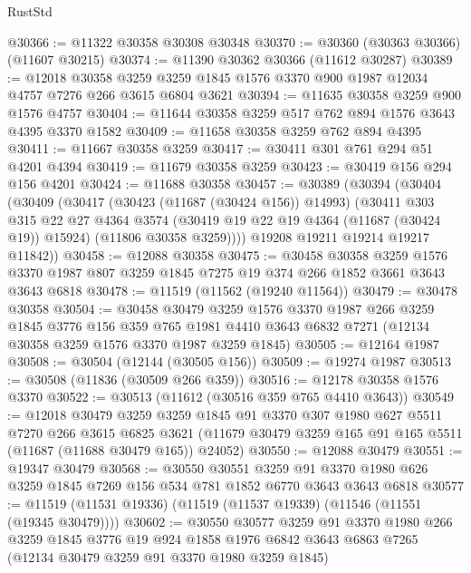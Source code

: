 \begin{lexlean}{RustStd}
\begin{coremodule}
@30366 := @11322 @30358 @30308 @30348
@30370 := @30360 (@30363 @30366) (@11607 @30215)
@30374 := @11390 @30362 @30366 (@11612 @30287)
@30389 := @12018
    @30358
    @3259
    @3259
    @1845
    @1576
    @3370
    @900
    @1987
    @12034
    @4757
    @7276
    @266
    @3615
    @6804
    @3621
@30394 := @11635 @30358 @3259 @900 @1576 @4757
@30404 := @11644 @30358 @3259 @517 @762 @894 @1576 @3643 @4395 @3370 @1582
@30409 := @11658 @30358 @3259 @762 @894 @4395
@30411 := @11667 @30358 @3259
@30417 := @30411 @301 @761 @294 @51 @4201 @4394
@30419 := @11679 @30358 @3259
@30423 := @30419 @156 @294 @156 @4201
@30424 := @11688 @30358
@30457 := @30389
    (@30394
      (@30404
        (@30409
          (@30417
            (@30423 (@11687 (@30424 @156)) @14993)
            (@30411
              @303
              @315
              @22
              @27
              @4364
              @3574
              (@30419 @19 @22 @19 @4364 (@11687 (@30424 @19)) @15924)
              (@11806 @30358 @3259))))
        @19208
        @19211
        @19214
        @19217
        @11842))
@30458 := @12088 @30358
@30475 := @30458
    @30358
    @3259
    @1576
    @3370
    @1987
    @807
    @3259
    @1845
    @7275
    @19
    @374
    @266
    @1852
    @3661
    @3643
    @3643
    @6818
@30478 := @11519 (@11562 (@19240 @11564))
@30479 := @30478 @30358
@30504 := @30458
    @30479
    @3259
    @1576
    @3370
    @1987
    @266
    @3259
    @1845
    @3776
    @156
    @359
    @765
    @1981
    @4410
    @3643
    @6832
    @7271
    (@12134 @30358 @3259 @1576 @3370 @1987 @3259 @1845)
@30505 := @12164 @1987
@30508 := @30504 (@12144 (@30505 @156))
@30509 := @19274 @1987
@30513 := @30508 (@11836 (@30509 @266 @359))
@30516 := @12178 @30358 @1576 @3370
@30522 := @30513 (@11612 (@30516 @359 @765 @4410 @3643))
@30549 := @12018
    @30479
    @3259
    @3259
    @1845
    @91
    @3370
    @307
    @1980
    @627
    @5511
    @7270
    @266
    @3615
    @6825
    @3621
    (@11679 @30479 @3259 @165 @91 @165 @5511 (@11687 (@11688 @30479 @165)) @24052)
@30550 := @12088 @30479
@30551 := @19347 @30479
@30568 := @30550
    @30551
    @3259
    @91
    @3370
    @1980
    @626
    @3259
    @1845
    @7269
    @156
    @534
    @781
    @1852
    @6770
    @3643
    @3643
    @6818
@30577 := @11519 (@11531 @19336) (@11519 (@11537 @19339) (@11546 (@11551 (@19345 @30479))))
@30602 := @30550
    @30577
    @3259
    @91
    @3370
    @1980
    @266
    @3259
    @1845
    @3776
    @19
    @924
    @1858
    @1976
    @6842
    @3643
    @6863
    @7265
    (@12134 @30479 @3259 @91 @3370 @1980 @3259 @1845)

\end{coremodule}
\end{lexlean}

